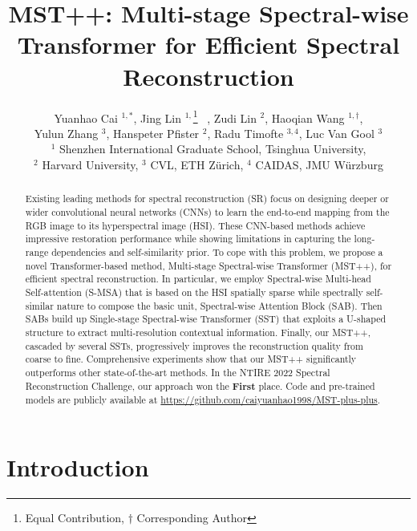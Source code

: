 \documentclass[10pt,twocolumn,letterpaper]{article}
\begin{document}
\title{MST++: Multi-stage Spectral-wise\\ Transformer for Efficient Spectral Reconstruction}

\author{Yuanhao Cai $^{1,*}$, Jing Lin $^{1,}$\thanks{Equal Contribution, $\dagger$ Corresponding Author} ~, Zudi Lin $^2$, Haoqian Wang $^{1,\dagger}$,\\  Yulun Zhang $^3$, Hanspeter Pfister $^2$, Radu Timofte $^{3,4}$,  Luc Van Gool $^{3}$ \\
	$^{1}$ Shenzhen International Graduate School, Tsinghua University, \\$^2$ Harvard University, $^3$ CVL, ETH Z\"{u}rich, $^4$ CAIDAS, JMU W\"urzburg
}
\maketitle

\begin{abstract}
Existing leading methods for spectral reconstruction (SR) focus on designing deeper or wider convolutional neural networks (CNNs) to learn the end-to-end mapping from the RGB image to its hyperspectral image (HSI). These CNN-based methods achieve impressive restoration performance while showing limitations in capturing the long-range dependencies and self-similarity prior. To cope with this problem, we propose a novel Transformer-based method, Multi-stage Spectral-wise Transformer (MST++),  for efficient spectral reconstruction. In particular, we employ Spectral-wise Multi-head Self-attention (S-MSA) that is based on the HSI spatially sparse while spectrally self-similar nature to compose the basic unit, Spectral-wise Attention Block (SAB). Then SABs build up Single-stage Spectral-wise Transformer (SST) that exploits a U-shaped structure to extract multi-resolution contextual information. Finally, our MST++, cascaded by several SSTs, progressively improves the reconstruction quality from coarse to fine. Comprehensive experiments show that our MST++ significantly outperforms other state-of-the-art methods. In the NTIRE 2022 Spectral Reconstruction Challenge,
our approach won the \textbf{First} place. Code and pre-trained models are publicly available at \url{https://github.com/caiyuanhao1998/MST-plus-plus}. 

\end{abstract}

\section{Introduction}
\end{document}

